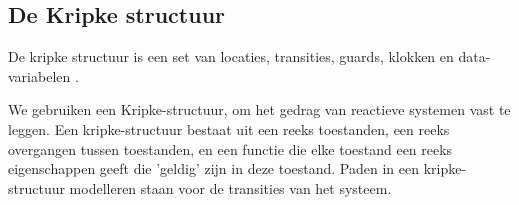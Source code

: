 \documentclass{article}
\begin{document}
	\subsection{De Kripke structuur}
	De kripke structuur is een set van locaties, transities, guards, klokken en data-variabelen .	
%	
%	
	
	We gebruiken een Kripke-structuur, om  het gedrag van reactieve systemen vast te leggen. Een kripke-structuur bestaat uit een reeks toestanden, een reeks overgangen tussen toestanden, en een functie die elke toestand een reeks eigenschappen geeft die 'geldig' zijn in deze toestand.
	Paden in een kripke-structuur modelleren staan voor de transities van het systeem.
	  
	
	 
	
	
\end{document}
